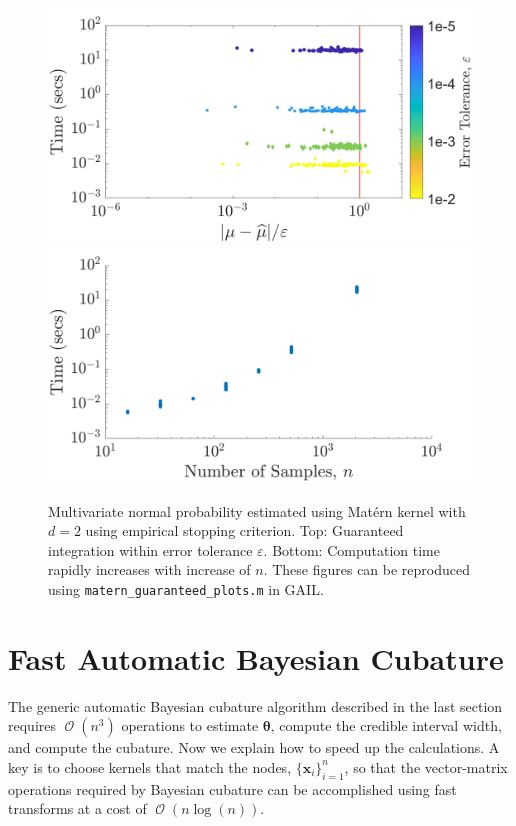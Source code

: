 \documentclass[twocolumn]{svjour3}          %
\DeclareMathOperator{\Order}{{\mathcal O}}
\newcommand{\bm}[1]{\boldsymbol{#1}}
\newcommand{\vtheta}{{\bm{\theta}}}
\newcommand{\vx}{\bm{x}}
\newcommand{\code}[1]{\texttt{#1}}
\begin{document}
\begin{figure}
	\centering
		\includegraphics[width=0.95\linewidth]{MVN_guaranteed_time_Matern_d2_2018-Aug-31}
	\centering
		\includegraphics[width=0.95\linewidth]{MVN_rapid_n_vs_time_Matern_d2_2018-Aug-31}
	\caption{Multivariate normal probability estimated using Mat\'ern kernel with $d=2$ using empirical stopping criterion. Top: Guaranteed integration within error tolerance $\varepsilon$. Bottom: Computation time rapidly increases with increase of $n$. These figures can be reproduced using \code{matern\_guaranteed\_plots.m} in GAIL.}
	\label{fig:MVN_Metern_d2b2}
\end{figure}

\section{Fast Automatic Bayesian Cubature}\label{sec:fast_BC}

The generic automatic Bayesian cubature algorithm described in the last section requires $\Order(n^3)$ operations to estimate $\vtheta$, compute the credible interval width, and compute the cubature. Now we explain how to speed up the calculations. A key is to choose kernels that match the nodes, $\{\vx_i\}_{i=1}^n$, so that the vector-matrix operations required by Bayesian cubature can be accomplished using fast transforms at a cost of $\Order(n \log(n))$.
\end{document}
